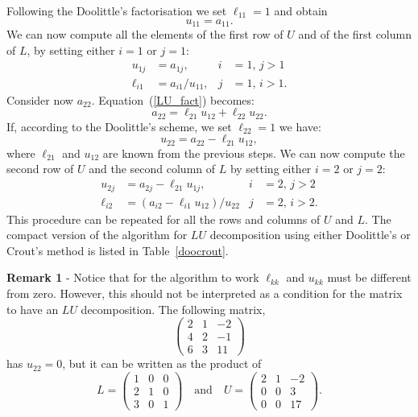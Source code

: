 Following the Doolittle's factorisation we set $\ell_{1 1} = 1$ and
obtain
%
\begin{equation*}
  u_{1 1} = a_{1 1} .
\end{equation*}
%
We can now compute all the elements of the first row of $U$ and of the
first column of $L$, by setting either $i=1$ or $j=1$:
%
\begin{align}
  u_{1 j} & = a_{1 j} , & i & = 1, \, j > 1 \\
  \ell_{i 1} &= a_{i 1} / u_{1 1} , & j & = 1, \, i > 1 .
\end{align}
%
Consider now $a_{2 2}$.   Equation~(\ref{LU_fact}) becomes:
%
\begin{equation*}
  a_{2 2} = \ell_{2 1} u_{1 2} + \ell_{2 2} u_{2 2} .
\end{equation*}
%
If, according to the Doolittle's scheme, we set $\ell_{2 2} = 1$ we
have:
%
\begin{equation*}
  u_{2 2} = a_{2 2} - \ell_{2 1} u_{1 2} ,
\end{equation*}
%
where $\ell_{2 1}$ and $u_{1 2}$ are known from the previous steps.
We can now compute the second row of $U$ and the second column of $L$
by setting either $i=2$ or $j=2$:
%
\begin{align}
  u_{2 j} & = a_{2 j} - \ell_{2 1} u_{1 j}, & i & = 2, \, j > 2 \\
  \ell_{i 2} & = \left ( a_{i 2} - \ell_{i 1} u_{1 2} \right )/ u_{2
    2} & j & = 2, \, i > 2.
\end{align}
%
This procedure can be repeated for all the rows and columns of $U$ and
$L$.   The compact version of the algorithm for $LU$ decomposition using
either Doolittle's or Crout's method is listed in
Table~\ref{doocrout}.


\smallskip

\noindent \textbf{Remark 1} - Notice that for the algorithm to work
$\ell_{k k}$ and $u_{k k}$ must be different from zero.  However, this
should not be interpreted as a condition for the matrix to have an
$LU$ decomposition.   The following matrix,
%
\begin{equation*}
  \begin{pmatrix}
    2 & 1 & -2 \\ 4 & 2 & -1 \\ 6 & 3 & 11
  \end{pmatrix}
\end{equation*}
%
has $u_{2 2} =0 $, but it can be written as the product of
%
\begin{equation*}
  L =
  \begin{pmatrix}
    1 & 0 & 0 \\ 2 & 1 & 0 \\ 3 & 0 & 1
  \end{pmatrix}
  \quad \text{and} \quad
  U =
  \begin{pmatrix}
    2 & 1 & -2 \\ 0 & 0 & 3 \\ 0 & 0 & 17
  \end{pmatrix} .
\end{equation*}


